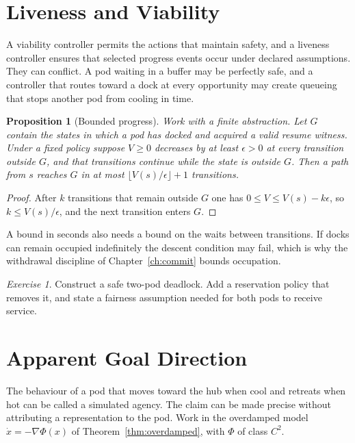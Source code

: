 \documentclass[11pt,openany]{book}
\theoremstyle{plain}
\newtheorem{proposition}[theorem]{Proposition}
\theoremstyle{definition}
\theoremstyle{remark}
\newtheorem{exercise}[theorem]{Exercise}
\begin{document}
\section{Liveness and Viability}

A viability controller permits the actions that maintain safety, and a liveness controller ensures that selected progress events occur under declared assumptions. They can conflict. A pod waiting in a buffer may be perfectly safe, and a controller that routes toward a dock at every opportunity may create queueing that stops another pod from cooling in time.

\begin{proposition}[Bounded progress]
\label{prop:progress}
Work with a finite abstraction. Let $G$ contain the states in which a pod has docked and acquired a valid resume witness. Under a fixed policy suppose $V\ge0$ decreases by at least $\epsilon>0$ at every transition outside $G$, and that transitions continue while the state is outside $G$. Then a path from $s$ reaches $G$ in at most $\lfloor V(s)/\epsilon\rfloor+1$ transitions.
\end{proposition}
\begin{proof}
After $k$ transitions that remain outside $G$ one has $0\le V\le V(s)-k\epsilon$, so $k\le V(s)/\epsilon$, and the next transition enters $G$.
\end{proof}

A bound in seconds also needs a bound on the waits between transitions. If docks can remain occupied indefinitely the descent condition may fail, which is why the withdrawal discipline of Chapter~\ref{ch:commit} bounds occupation.

\begin{exercise}
Construct a safe two-pod deadlock. Add a reservation policy that removes it, and state a fairness assumption needed for both pods to receive service.
\end{exercise}

\section{Apparent Goal Direction}

The behaviour of a pod that moves toward the hub when cool and retreats when hot can be called a simulated agency. The claim can be made precise without attributing a representation to the pod. Work in the overdamped model $\dot x=-\nabla\Phi(x)$ of Theorem~\ref{thm:overdamped}, with $\Phi$ of class $C^2$.
\end{document}
